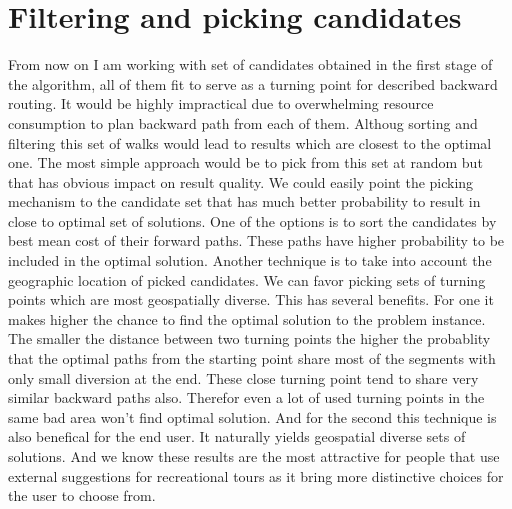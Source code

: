 \documentclass{ctuthesis}
\begin{document}
\section{Filtering and picking candidates}
From now on I am working with set of candidates obtained in the first stage of the algorithm, all of them fit to serve as a turning point for described backward routing. It would be highly impractical due to overwhelming resource consumption to plan backward path from each of them. Althoug sorting and filtering this set of walks would lead to results which are closest to the optimal one. The most simple approach would be to pick from this set at random but that has obvious impact on result quality. We could easily point the picking mechanism to the candidate set that has much better probability to result in close to optimal set of solutions. One of the options is to sort the candidates by best mean cost of their forward paths. These paths have higher probability to be included in the optimal solution. Another technique is to take into account the geographic location of picked candidates. We can favor picking sets of turning points which are most geospatially diverse. This has several benefits. For one it makes higher the chance to find the optimal solution to the problem instance. The smaller the distance between two turning points the higher the probablity that the optimal paths from the starting point share most of the segments with only small diversion at the end. These close turning point tend to share very similar backward paths also. Therefor even a lot of used turning points in the same bad area won't find optimal solution. And for the second this technique is also benefical for the end user. It naturally yields geospatial diverse sets of solutions. And we know these results are the most attractive for people that use external suggestions for recreational tours as it bring more distinctive choices for the user to choose from.
\end{document}

